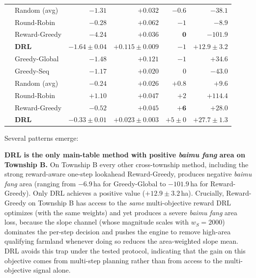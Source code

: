 \documentclass[preprint,12pt]{elsarticle}
\begin{document}
\begin{table}[htbp]
{\begin{tabular}{llrrrr}
 & Random (avg)     & $-1.31$          & $+0.032$          & $-0.6$         & $-38.1$ \\
 & Round-Robin      & $-0.28$          & $+0.062$          & $-1$           & $-8.9$ \\
 & Reward-Greedy    & $\mathbf{-4.24}$ & $+0.036$          & $\mathbf{0}$   & $-101.9$ \\
 & \textbf{DRL}     & $-1.64 \pm 0.04$ & $+0.115 \pm 0.009$& $-1$           & $\mathbf{+12.9 \pm 3.2}$ \\
\midrule
{}
 & Greedy-Global    & $\mathbf{-1.48}$ & $\mathbf{+0.121}$ & $-1$           & $+34.6$ \\
 & Greedy-Seq       & $-1.17$          & $+0.020$          & $0$            & $-43.0$ \\
 & Random (avg)     & $-0.24$          & $+0.026$          & $+0.8$         & $+9.6$ \\
 & Round-Robin      & $+1.10$          & $+0.047$          & $+2$           & $\mathbf{+114.4}$ \\
 & Reward-Greedy    & $-0.52$          & $+0.045$          & $\mathbf{+6}$  & $+28.0$ \\
 & \textbf{DRL}     & $-0.33 \pm 0.01$ & $+0.023 \pm 0.003$& $+5 \pm 0$     & $+27.7 \pm 1.3$ \\
\bottomrule
\end{tabular}%
}
\end{table}

Several patterns emerge:

\textbf{DRL is the only main-table method with positive \textit{baimu fang} area on Township B.} On Township B every other cross-township method, including the strong reward-aware one-step lookahead Reward-Greedy, produces negative \textit{baimu fang} area (ranging from $-6.9$\,ha for Greedy-Global to $-101.9$\,ha for Reward-Greedy). Only DRL achieves a positive value ($+12.9\pm3.2$\,ha). Crucially, Reward-Greedy on Township B has access to the \emph{same} multi-objective reward DRL optimizes (with the same weights) and yet produces a severe \textit{baimu fang} area loss, because the slope channel (whose magnitude scales with $w_S=2000$) dominates the per-step decision and pushes the engine to remove high-area qualifying farmland whenever doing so reduces the area-weighted slope mean. DRL avoids this trap under the tested protocol, indicating that the gain on this objective comes from multi-step planning rather than from access to the multi-objective signal alone.
\end{document}
